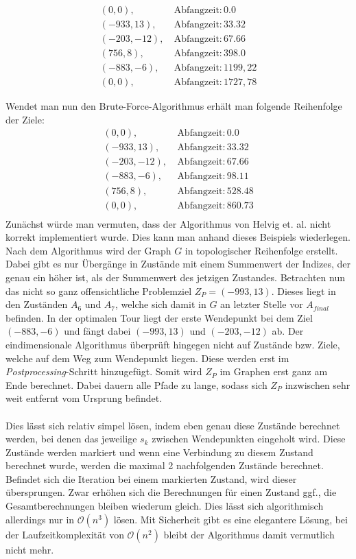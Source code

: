 \documentclass{scrartcl}
\begin{document}
\begin{align*}
(0,0),~ &\text{Abfangzeit}: 0.0 \\
(-933, 13),~ &\text{Abfangzeit}: 33.32 \\
(-203, -12),~ &\text{Abfangzeit}: 67.66 \\
(756, 8),~ &\text{Abfangzeit}: 398.0 \\
(-883, -6),~ &\text{Abfangzeit}: 1199,22 \\
(0, 0),~ &\text{Abfangzeit}: 1727,78 
\end{align*}

Wendet man nun den Brute-Force-Algorithmus erhält man folgende Reihenfolge der Ziele:
\begin{align*}
(0, 0),~ &\text{Abfangzeit}: 0.0 \\
(-933, 13),~ &\text{Abfangzeit}: 33.32 \\
(-203, -12),~ &\text{Abfangzeit}: 67.66 \\
(-883, -6),~ &\text{Abfangzeit}: 98.11 \\
(756, 8),~ &\text{Abfangzeit}: 528.48 \\
(0, 0),~ &\text{Abfangzeit}: 860.73 \\
\end{align*}
Zunächst würde man vermuten, dass der Algorithmus von Helvig et. al. nicht korrekt implementiert wurde. Dies kann man anhand dieses Beispiels wiederlegen. \\
Nach dem Algorithmus wird der Graph $G$ in topologischer Reihenfolge erstellt. Dabei gibt es nur Übergänge in Zustände mit einem Summenwert der Indizes, der genau ein höher ist, als der Summenwert des jetzigen Zustandes. Betrachten nun das nicht so ganz offensichtliche Problemziel $Z_P=(-993, 13)$. Dieses liegt in den Zuständen $A_6$ und $A_7$, welche sich damit in $G$ an letzter Stelle vor $A_{final}$ befinden. In der optimalen Tour liegt der erste Wendepunkt bei dem Ziel $(-883, -6)$ und fängt dabei $(-993, 13)$ und $(-203,-12)$ ab. Der eindimensionale Algorithmus überprüft hingegen nicht auf Zustände bzw. Ziele, welche auf dem Weg zum Wendepunkt liegen. Diese werden erst im \emph{Postprocessing}-Schritt hinzugefügt. Somit wird $Z_P$ im Graphen erst ganz am Ende berechnet. Dabei dauern alle Pfade zu lange, sodass sich $Z_P$ inzwischen sehr weit entfernt vom Ursprung befindet. \\\\
Dies lässt sich relativ simpel lösen, indem eben genau diese Zustände berechnet werden, bei denen das jeweilige $s_k$ zwischen Wendepunkten eingeholt wird. Diese Zustände werden markiert und wenn eine Verbindung zu diesem Zustand berechnet wurde, werden die maximal 2 nachfolgenden Zustände berechnet. Befindet sich die Iteration bei einem markierten Zustand, wird dieser übersprungen. Zwar erhöhen sich die Berechnungen für einen Zustand ggf., die Gesamtberechnungen bleiben wiederum gleich. Dies lässt sich algorithmisch allerdings nur in $\mathcal{O}(n^3)$ lösen. Mit Sicherheit gibt es eine elegantere Lösung, bei der Laufzeitkomplexität von $\mathcal{O}(n^2)$ bleibt der Algorithmus damit vermutlich nicht mehr.
\end{document}
